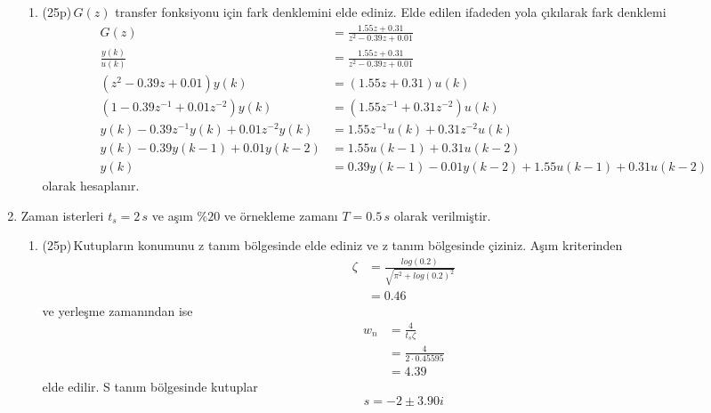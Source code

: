 \begin{enumerate}[\bfseries S1.]
\begin{enumerate}
        \item(25p)\,$G(z)$ transfer fonksiyonu için fark denklemini elde ediniz. 
        Elde edilen ifadeden yola çıkılarak fark denklemi
        \begin{equation}
            \begin{split}
                G(z)&=\frac{1.55z+0.31}{z^2-0.39z+0.01}\\
                \frac{y(k)}{u(k)}&=\frac{1.55z+0.31}{z^2-0.39z+0.01}\\
                (z^2-0.39z+0.01)y(k)&=(1.55z+0.31)u(k)\\
                (1-0.39z^{-1}+0.01z^{-2})y(k)&=(1.55z^{-1}+0.31z^{-2})u(k)\\
                y(k)-0.39z^{-1}y(k)+0.01z^{-2}y(k)&=1.55z^{-1}u(k)+0.31z^{-2}u(k)\\
                y(k)-0.39y(k-1)+0.01y(k-2)&=1.55u(k-1)+0.31u(k-2)\\
                y(k)&=0.39y(k-1)-0.01y(k-2)+1.55u(k-1)+0.31u(k-2)
            \end{split}
        \end{equation}
        olarak hesaplanır.      
    \end{enumerate}
    \item Zaman isterleri $t_s=2\,s$ ve aşım $\%20$ ve örnekleme zamanı $T=0.5\,s$ olarak verilmiştir. 
    \begin{enumerate}
        \item(25p)\,Kutupların konumunu z tanım bölgesinde elde ediniz ve z tanım bölgesinde çiziniz. 
        Aşım kriterinden
        \begin{equation}
        \begin{split}
            \zeta&=\frac{log(0.2)}{\sqrt{\pi^2+log(0.2)^2}}\\
            &=0.46
        \end{split}
        \end{equation}
        ve yerleşme zamanından ise 
        \begin{equation}
            \begin{split}
                w_n&=\frac{4}{t_s\zeta}\\
                &=\frac{4}{2\cdot 0.45595}\\
                &=4.39
            \end{split}
        \end{equation}
        elde edilir. S tanım bölgesinde kutuplar
        \begin{equation}
            s=-2\pm3.90i

\end{equation}
\end{enumerate}
\end{enumerate}
